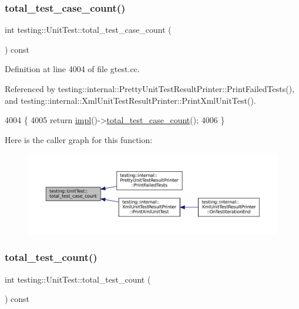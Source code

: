 \subsubsection{\texorpdfstring{total\+\_\+test\+\_\+case\+\_\+count()}{total\_test\_case\_count()}}
{\footnotesize\ttfamily int testing\+::\+Unit\+Test\+::total\+\_\+test\+\_\+case\+\_\+count (\begin{DoxyParamCaption}{ }\end{DoxyParamCaption}) const}



Definition at line 4004 of file gtest.\+cc.



Referenced by testing\+::internal\+::\+Pretty\+Unit\+Test\+Result\+Printer\+::\+Print\+Failed\+Tests(), and testing\+::internal\+::\+Xml\+Unit\+Test\+Result\+Printer\+::\+Print\+Xml\+Unit\+Test().


\begin{DoxyCode}
4004                                           \{
4005   \textcolor{keywordflow}{return} \hyperlink{classtesting_1_1UnitTest_a4df5d11a58affb337d7fa62eaa07690e}{impl}()->\hyperlink{classtesting_1_1internal_1_1UnitTestImpl_ac1d81d6b146b2dbce460f9a0a57d4f9e}{total\_test\_case\_count}();
4006 \}
\end{DoxyCode}
Here is the caller graph for this function\+:
\nopagebreak
\begin{figure}[H]
\begin{center}
\leavevmode
\includegraphics[width=350pt]{classtesting_1_1UnitTest_a93fc8f4eebc3212d06468ad216830ced_icgraph}
\end{center}
\end{figure}
\mbox{\label{classtesting_1_1UnitTest_af6e02fcf76fd7247687f4e8af6e7ef41}} 
\subsubsection{\texorpdfstring{total\+\_\+test\+\_\+count()}{total\_test\_count()}}
{\footnotesize\ttfamily int testing\+::\+Unit\+Test\+::total\+\_\+test\+\_\+count (\begin{DoxyParamCaption}{ }\end{DoxyParamCaption}) const}



